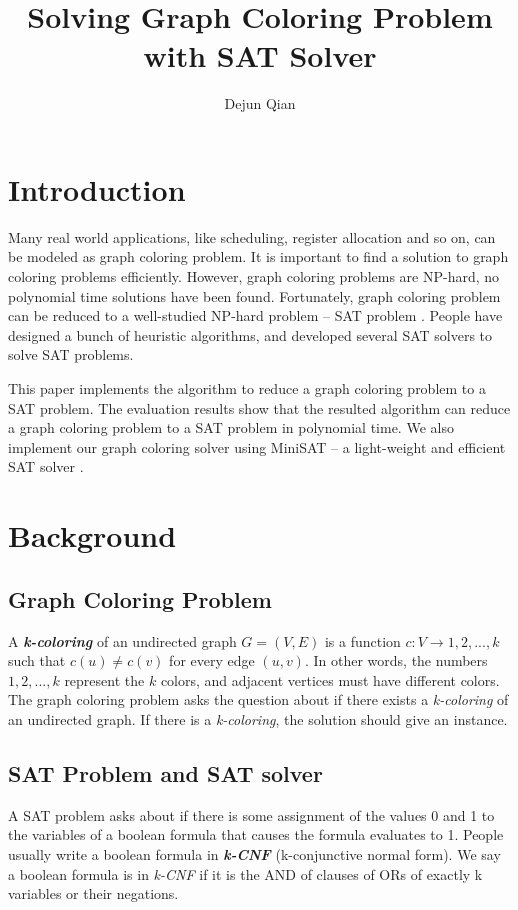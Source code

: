 \documentclass[11pt,letterpaper,oneside]{article}
\title{Solving Graph Coloring Problem with SAT Solver}
\author{Dejun Qian}
\date{}
\begin{document}
\maketitle

\section{Introduction}
Many real world applications, like scheduling, register allocation and so on, can be modeled as graph coloring problem. It is important to find a solution to graph coloring problems efficiently. However, graph coloring problems are NP-hard, no polynomial time solutions have been found. Fortunately, graph coloring problem can be reduced to a well-studied NP-hard problem -- SAT problem \cite{reducibility}. People have designed a bunch of heuristic algorithms, and developed several SAT solvers to solve SAT problems.

This paper implements the algorithm to reduce a graph coloring problem to a SAT problem. The evaluation results show that the resulted algorithm can reduce a graph coloring problem to a SAT problem in polynomial time. We also implement our graph coloring solver using MiniSAT -- a light-weight and efficient SAT solver \cite{minisat}.

\section{Background}
\label{sec:background}
\subsection{Graph Coloring Problem}
A \textit{\textbf{k-coloring}} of an undirected graph $G=(V,E)$ is a function $c: V \rightarrow {1, 2, ..., k}$ such that $c(u) \neq c(v)$ for every edge $(u,v)$. In other words, the numbers $1,2,...,k$ represent the $k$ colors, and adjacent vertices must have different colors. The graph coloring problem asks the question about if there exists a \textit{k-coloring} of an undirected graph. If there is a \textit{k-coloring}, the solution should give an instance.

\subsection{SAT Problem and SAT solver}
A SAT problem asks about if there is some assignment of the values 0 and 1 to the variables of a boolean formula that causes the formula evaluates to 1. People usually write a boolean formula in \textit{\textbf{k-CNF}} (k-conjunctive normal form). We say a boolean formula is in \textit{k-CNF} if it is the AND of clauses of ORs of exactly k variables or their negations.
\end{document}
